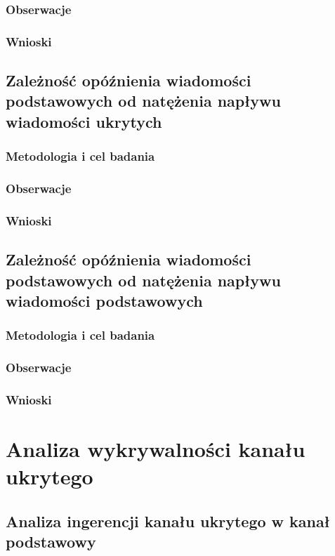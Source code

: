 \documentclass[a4paper, twoside]{report}
\begin{document}
        \subsection{Obserwacje}
        \subsection{Wnioski}

    \section{Zależność opóźnienia wiadomości podstawowych od natężenia napływu wiadomości ukrytych}
        \subsection{Metodologia i cel badania}
        \subsection{Obserwacje}
        \subsection{Wnioski}

    \section{Zależność opóźnienia wiadomości podstawowych od natężenia napływu wiadomości podstawowych}
        \subsection{Metodologia i cel badania}
        \subsection{Obserwacje}
        \subsection{Wnioski}


\chapter{Analiza wykrywalności kanału ukrytego}
    \section{Analiza ingerencji kanału ukrytego w kanał podstawowy}
\end{document}
